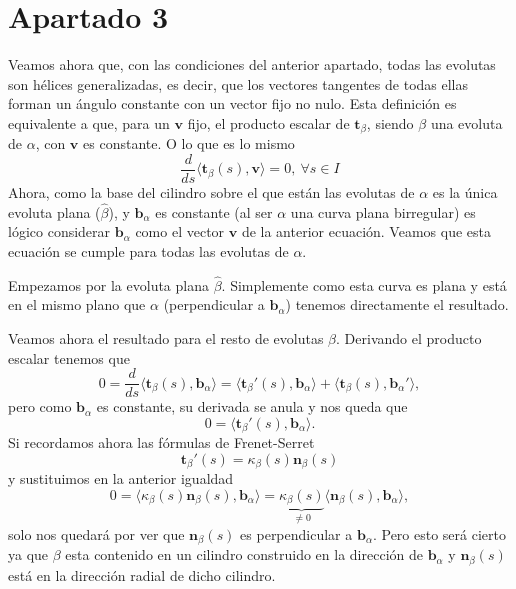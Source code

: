 \section{Apartado 3}
Veamos ahora que, con las condiciones del anterior apartado, todas las evolutas
son hélices generalizadas, es decir, que los vectores tangentes de todas ellas
forman un ángulo constante con un vector fijo no nulo. Esta definición es
equivalente a que, para un $\mathbf{v}$ fijo, el producto escalar de
$\mathbf{t}_{\beta}$, siendo $\beta$ una evoluta de $\alpha$, con $\mathbf{v}$
es constante. O lo que es lo mismo
\[
    \frac{d}{ds}\langle \mathbf{t}_{\beta}\left( s \right), \mathbf{v} \rangle
    = 0,\ \forall s \in I
\]
Ahora, como la base del cilindro sobre el que están las evolutas de $\alpha$ es
la única evoluta plana ($\hat{\beta}$), y $\mathbf{b}_{\alpha}$ es constante (al
ser $\alpha$ una curva plana birregular) es lógico considerar
$\mathbf{b}_{\alpha}$ como el vector $\mathbf{v}$ de la anterior ecuación.
Veamos que esta ecuación se cumple para todas las evolutas de $\alpha$.

Empezamos por la evoluta plana $\hat{\beta}$. Simplemente como esta curva es
plana y está en el mismo plano que $\alpha$ (perpendicular a
$\mathbf{b}_{\alpha}$) tenemos directamente el resultado.

Veamos ahora el resultado para el resto de evolutas $\beta$. Derivando el
producto escalar tenemos que
\[
0 = \frac{d}{ds}\langle \mathbf{t}_{\beta}\left( s \right),
\mathbf{b}_{\alpha} \rangle = \langle
\mathbf{t}_{\beta}'\left( s \right), \mathbf{b}_{\alpha} \rangle
+ \langle \mathbf{t}_{\beta}\left( s \right),
\mathbf{b}_{\alpha}' \rangle,
\]
pero como $\mathbf{b}_{\alpha}$ es constante, su derivada se anula y nos queda
que
\[
0 = \langle \mathbf{t}_{\beta}'\left( s \right), \mathbf{b}_{\alpha} \rangle.
\]
Si recordamos ahora las fórmulas de Frenet-Serret
\[
\mathbf{t}_{\beta}'\left( s \right) = \kappa_{\beta}\left( s \right)\mathbf{n}_{\beta}\left( s \right)
\]
y sustituimos en la anterior igualdad
\[
0 = \langle \kappa_{\beta}\left( s \right)\mathbf{n}_{\beta}\left( s \right),
\mathbf{b}_{\alpha} \rangle = \underbrace{\kappa_{\beta}\left( s \right)}_{\neq 0}\langle
\mathbf{n}_{\beta}\left( s \right), \mathbf{b}_{\alpha} \rangle,
\]
solo nos quedará por ver que $\mathbf{n}_{\beta}\left( s \right)$ es
perpendicular a $\mathbf{b}_{\alpha}$. Pero esto será cierto ya que $\beta$ esta
contenido en un cilindro construido en la dirección de $\mathbf{b}_{\alpha}$ y
$\mathbf{n}_{\beta}\left( s \right)$ está en la dirección radial de dicho
cilindro.
